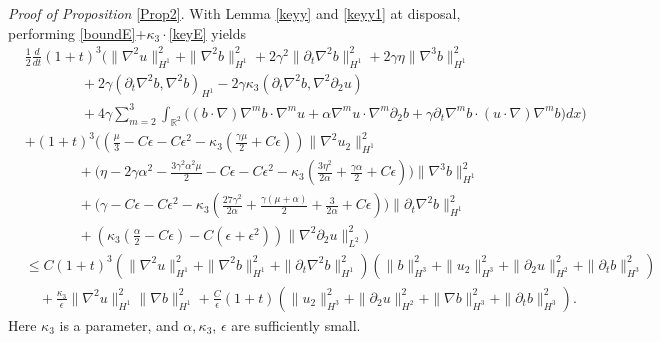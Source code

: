 \documentclass[reqno,11pt]{amsart}
\numberwithin{Thm}{section}
\begin{document}
 \textit{Proof of Proposition} \ref{Prop2}. With Lemma \ref{keyy} and \ref{keyy1} at disposal, performing \eqref{boundE}+$\kappa_3\cdot$\eqref{keyE} yields
\begin{align*}
&\frac{1}{2}\frac{d}{dt}(1+t)^3\bigg(\|\nabla^2 u\|^2_{H^1}+\|\nabla^2 b\|^2_{H^1}+2\gamma^2\|\partial_t\nabla^2b\|^2_{H^1}
+2\gamma\eta\|\nabla^{3}b\|^2_{H^1}\nonumber\\
&\qquad\qquad+2\gamma(\partial_t\nabla^2b,\nabla^2b)_{H^1}-2\gamma\kappa_3(\partial_t\nabla^2b,\nabla^2\partial_2u)\nonumber\\
&\qquad\qquad+4\gamma\sum_{m=2}^3\int_{\mathbb{R}^2}
		\big((b\cdot\nabla)\nabla^m b\cdot\nabla^m u
		+\alpha\nabla^m u\cdot\nabla^m\partial_2 b
		+\gamma\partial_t\nabla^m b\cdot (u\cdot\nabla)\nabla^m b\big)dx\bigg)\nonumber\\       &+(1+t)^3\Big((\frac{\mu}{3}-C\epsilon-C\epsilon^2-\kappa_3(\frac{\gamma\mu}{2}+C\epsilon))\|\nabla^{2}u_2\|^2_{H^1}\nonumber\\
&\qquad\ \ \ \ \ \ \ \ +\big(\eta-2\gamma\alpha^2-\frac{3\gamma^2\alpha^2\mu}{2}-C\epsilon-C\epsilon^2-\kappa_3(\frac{3\eta^2}{2\alpha}+\frac{\gamma\alpha}{2}+C\epsilon)\big)\|\nabla^{3}b\|^2_{H^1}\nonumber\\
&\qquad\ \ \ \ \ \ \ \ +\big(\gamma-C\epsilon-C\epsilon^2-\kappa_3(\frac{27\gamma^2}{2\alpha}+\frac{\gamma(\mu+\alpha)}{2}+\frac{3}{2\alpha}+C\epsilon)\big)\|\partial_t\nabla^2b\|^2_{H^1}\nonumber\\
&\qquad\ \ \ \ \ \ \ \ +(\kappa_3(\frac{\alpha}{2}-C\epsilon)- C(\epsilon+\epsilon^2))\|\nabla^2\partial_2u\|_{L^2}^2\Big)\nonumber\\
&\leq C(1+t)^3(\|\nabla^2 u\|_{H^1}^2+\|\nabla^2 b\|_{H^1}^2+\|\partial_t\nabla^2 b\|_{H^{1}}^2)(\| b\|_{H^3}^2+\| u_2\|_{H^3}^2+\| \partial_2u\|_{H^2}^2+\|\partial_t b\|_{H^3}^2)\nonumber\\
&\quad+\frac{\kappa_3}{\epsilon}\|\nabla^2 u\|_{H^{1}}^2\|\nabla b\|_{H^{1}}^2+\frac{C}{\epsilon}(1+t)(\|u_2\|_{H^3}^2+\|\partial_2 u\|_{H^2}^2+\|\nabla b\|_{H^3}^2+\|\partial_t b\|_{H^3}^2).
\end{align*}
Here $\kappa_3$ is a  parameter, and $\alpha, \kappa_3$, $\epsilon$ are sufficiently small.
\end{document}
